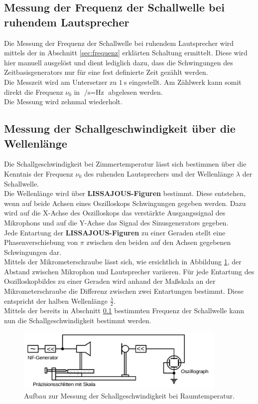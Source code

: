 \FloatBarrier
\subsection{Messung der Frequenz der Schallwelle bei ruhendem Lautsprecher}
\label{sec:schall} %
Die Messung der Frequenz der Schallwelle bei ruhendem Lautsprecher wird mittels der in Abschnitt \ref{sec:frequenz} erklärten Schaltung ermittelt.
Diese wird hier manuell ausgelöst und dient lediglich dazu, dass die Schwingungen des Zeitbasisgenerators nur für eine fest definierte Zeit gezählt werden.\\
Die Messzeit wird am Untersetzer zu $\SI{1}{\second}$ eingestellt. Am Zählwerk kann somit direkt die Frequenz $\nu_{\mathrm{0}}$ in $\si{\per\second}=\si{\Hz}$ abgelesen werden.\\
Die Messung wird zehnmal wiederholt.
\subsection{Messung der Schallgeschwindigkeit über die Wellenlänge}
Die Schallgeschwindigkeit bei Zimmertemperatur lässt sich bestimmen über die Kenntnis der Frequenz $\nu_{\mathrm{0}}$ des ruhenden Lautsprechers und der Wellenlänge $\lambda$ der Schallwelle.\\
Die Wellenlänge wird über \textbf{LISSAJOUS-Figuren} bestimmt.
Diese entstehen, wenn auf beide Achsen eines Oszilloskops Schwingungen gegeben werden. Dazu wird auf die X-Achse des Oszilloskops das verstärkte Ausgangssignal des Mikrophons und auf die Y-Achse das Signal des Sinusgenerators gegeben.\\
Jede Entartung der \textbf{LISSAJOUS-Figuren} zu einer Geraden stellt eine Phasenverschiebung von $\pi$ zwischen den beiden auf den Achsen gegebenen Schwingungen dar.\\
Mittels der Mikrometerschraube lässt sich, wie ersichtlich in Abbildung \ref{fig:lisa}, der Abstand zwischen Mikrophon und Lautsprecher variieren.
Für jede Entartung des Oszilloskopbildes zu einer Geraden wird anhand
der Maßskala an der Mikrometerschraube die Differenz zwischen zwei Entartungen bestimmt. Diese entspricht der halben Wellenlänge $\frac{\lambda}{2}$.\\
Mittels der bereits in Abschnitt \ref{sec:schall} bestimmten Frequenz der Schallwelle kann nun die Schallgeschwindigkeit bestimmt werden.

\begin{figure}
	\includegraphics[width=0.9\textwidth]{Bilder/lissajou.png}
	\caption{Aufbau zur Messung der Schallgeschwindigkeit bei Raumtemperatur. \cite{Anleitung}}
	\label{fig:lisa}
\end{figure}

